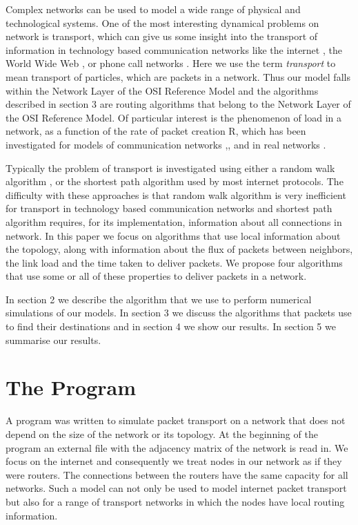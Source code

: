 \documentclass[runningheads]{llncs}
\begin{document}
Complex networks can be used to model a wide range of physical and
technological systems. One of the most interesting dynamical
problems on network is transport, which can give us some insight
into the transport of information in technology based communication
networks like the internet \cite{faloutsos}, the World Wide Web
\cite{albert},\cite{Huberman} or phone call networks \cite{Adamic}.
Here we use the term \emph{transport} to mean transport of particles, which
are packets in a network. Thus our model falls within the Network
Layer of the OSI Reference Model and the algorithms described in
section $3$ are routing algorithms that belong to the Network Layer
of the OSI Reference Model. Of particular interest is the phenomenon
of load in a network, as a function of the rate of packet creation
R, which has been investigated for models of communication networks
\cite{Tadic},\cite{Arenas},\cite{Sole} and in real networks
\cite{Jacobson}.

Typically the problem of transport is investigated using either a random
walk algorithm \cite{Tadic}, or the shortest path algorithm used by
most internet protocols. The difficulty with these approaches is
that random walk algorithm is very inefficient for transport in
technology based communication networks and shortest path algorithm
requires, for its implementation, information about all connections
in network. In this paper we focus on algorithms that use local
information about the topology, along with information about the flux of
packets between neighbors, the link load and the time taken to deliver
packets. We propose four algorithms that use some or all of these
properties to deliver packets in a network.

In section 2 we describe the algorithm that we use to perform numerical
simulations of our models. In section 3 we discuss the algorithms that
packets use to find their destinations and in section 4 we show our results.
In section 5 we summarise our results.



\section{The Program}
A program was written to simulate packet transport on a network that
does not depend on the size of the network or its
topology. At the beginning of the program an external file with
the adjacency matrix of the network is read in.
We focus on the internet and
consequently we treat nodes in our network as if they were routers.
The connections between the routers
have the same capacity for all networks. Such a model can
not only be used to model internet packet transport but also for a range of
transport networks in which the nodes have local routing information.
\end{document}

